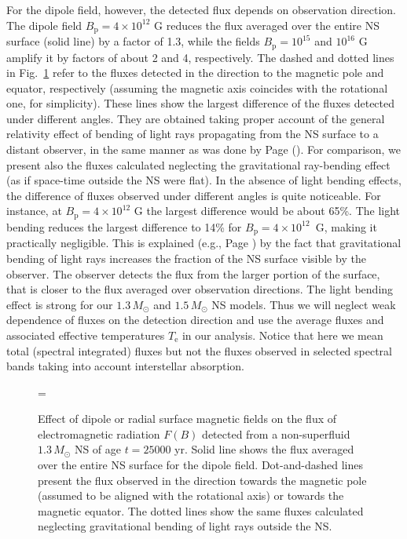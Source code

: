 \documentclass{aa}
\begin{document}
For the dipole field, however, the detected flux depends
on observation direction. 
The dipole field
$B_\mathrm{p} =4 \times 10^{12}$ G reduces the 
flux averaged over the entire NS surface (solid line)
by a factor of 1.3, while the fields 
$B_\mathrm{p} =10^{15}$ and $10^{16}$ G
amplify it by factors of
about 2 and 4, respectively.
The dashed
and dotted lines in Fig.~\ref{fig-c2} refer to the fluxes detected
in the direction to the magnetic pole and equator,
respectively (assuming the magnetic axis coincides
with the rotational one, for simplicity). These
lines show the largest difference of the fluxes
detected under different angles.
They are obtained taking proper account of
the general relativity effect of bending of light rays
propagating from the NS surface to a distant observer,
in the same manner as was done by Page (\cite{page95}).
For comparison, we present also the fluxes
calculated neglecting the gravitational ray-bending effect
(as if space-time outside the NS were flat).
In the absence of light
bending effects, the difference of fluxes
observed under different angles is quite
noticeable. For instance, at $B_\mathrm{p}=4 \times 10^{12}$ G
the largest difference would
be about 65\%.
The light bending reduces
the largest difference to 14\%
for $B_\mathrm{p} =4 \times 10^{12}$~G,
making it practically negligible.
This is explained
(e.g., Page \cite{page95}) by the fact that
gravitational bending of light rays increases
the fraction of the NS surface visible by
the observer. The observer detects the flux
from the larger portion of the surface, that
is closer to the flux averaged over observation directions.
The light bending effect is
strong for our $1.3\, M_\odot$ and $1.5\, M_\odot$
NS models. Thus we will neglect weak dependence of
fluxes on the detection direction and use the
average fluxes and associated effective
temperatures $T_\mathrm{e}$ in our analysis.
Notice that here we mean total (spectral integrated)
fluxes but not the fluxes observed in selected
spectral bands taking into account interstellar
absorption.

\begin{figure}
\centering
\epsfxsize=\hsize
\caption{Effect of dipole
or radial surface
magnetic fields on the flux of electromagnetic
radiation $F(B)$ detected from a
non-superfluid $1.3 \, M_\odot$
NS of age $t=25000$ yr. Solid line shows the
flux averaged over the entire NS surface
for the dipole field. Dot-and-dashed lines present
the flux observed in the direction towards the
magnetic pole (assumed to be aligned with the
rotational axis) or towards the magnetic equator.
The dotted lines show the same fluxes calculated
neglecting gravitational bending of light rays
outside the NS.
 }
\label{fig-c2}
\end{figure}
\end{document}
